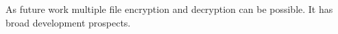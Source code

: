 \documentclass[12pt,journal,compsoc]{IEEEtran}
\begin{document}
As future work multiple file encryption and decryption can be possible. It has broad development prospects. 

{

}



%









\end{document}
